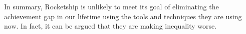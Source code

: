 In summary, Rocketship is unlikely to meet its goal of eliminating the achievement gap in our lifetime using the tools and techniques they are using now. In fact, it can be argued that they are making inequality worse.


